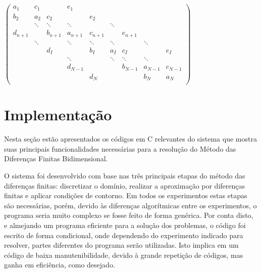 \documentclass[
	11pt,				%
	oneside,			%
	a4paper,			%
	english,			%
	brazil,				%
	]{article}
\begin{document}
$
\begin{pmatrix}
	a_1     & c_1     &         & e_1     &         &         &         &        
 &         \\
	b_2     & a_2     & c_2     &         & e_2     &         &         &        
 &         \\
	        & \ddots  & \ddots  & \ddots  &         & \ddots  &         &        
 &         \\
	d_{n+1} &         & b_{n+1} & a_{n+1} & c_{n+1} &         & e_{n+1} &        
 &         \\
	        & \ddots  &         & \ddots  & \ddots  & \ddots  &         & \ddots 
 &         \\
	        &         & d_I     &         & b_I     & a_I     & c_I     &        
 & e_I     \\
	        &         &         & \ddots  &         & \ddots  & \ddots  & \ddots 
 &         \\
	        &         &         & d_{N-1} &         &         & b_{N-1} & 
a_{N-1} & c_{N-1} \\
	        &         &         &         & d_N     &         &         & b_N    
 & a_N     \\
\end{pmatrix}
$


\section{Implementação}
Nesta seção estão apresentados os códigos em C relevantes do sistema que mostra 
suas principais funcionalidades necessárias para a resolução do Método das 
Diferenças Finitas Bidimensional.

O sistema foi desenvolvido com base nas três principais etapas do método das 
diferenças finitas: discretizar o domínio, realizar a aproximação por 
diferenças finitas e aplicar condições de contorno. Em todos os experimentos 
estas etapas são necessárias, porém, devido às diferenças algorítmicas entre os 
experimentos, o programa seria muito complexo se fosse feito de forma genérica. 
Por conta disto, e almejando um programa eficiente para a solução dos problemas, 
o código foi escrito de forma condicional, onde dependendo do experimento 
indicado para resolver, partes diferentes do programa serão utilizadas. Isto 
implica em um código de baixa manutenibilidade, devido à grande repetição de 
códigos, mas ganha em eficiência, como desejado.
\end{document}
